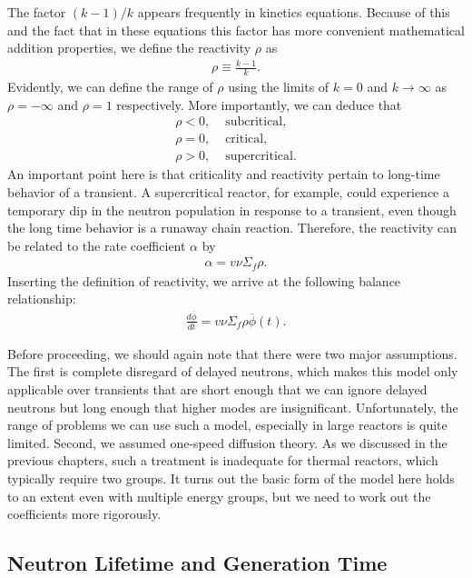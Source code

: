 The factor $(k-1)/k$ appears frequently in kinetics equations. Because of this and the fact that in these equations this factor has more convenient mathematical addition properties, we define the reactivity $\rho$ as
\begin{align}
  \rho \equiv \frac{ k - 1 }{ k } .
\end{align}
Evidently, we can define the range of $\rho$ using the limits of $k = 0$ and $k \rightarrow \infty$ as $\rho = -\infty$ and $\rho = 1$ respectively. More importantly, we can deduce that
\begin{align}
  \rho < 0, &\text{ subcritical,} \nonumber \\
  \rho = 0, &\text{ critical,} \nonumber \\
  \rho > 0, &\text{ supercritical.} \nonumber
\end{align}
An important point here is that criticality and reactivity pertain to long-time behavior of a transient. A supercritical reactor, for example, could experience a temporary dip in the neutron population in response to a transient, even though the long time behavior is a runaway chain reaction. Therefore, the reactivity can be related to the rate coefficient $\alpha$ by
\begin{align}
  \alpha = v \nu \Sigma_f \rho .
\end{align}
Inserting the definition of reactivity, we arrive at the following balance relationship:
\begin{align}
  \frac{d \overline{\phi}}{dt} = v \nu \Sigma_f \rho \overline{\phi}(t).
\end{align}

Before proceeding, we should again note that there were two major assumptions. The first is complete disregard of delayed neutrons, which makes this model only applicable over transients that are short enough that we can ignore delayed neutrons but long enough that higher modes are insignificant. Unfortunately, the range of problems we can use such a model, especially in large reactors is quite limited. Second, we assumed one-speed diffusion theory. As we discussed in the previous chapters, such a treatment is inadequate for thermal reactors, which typically require two groups. It turns out the basic form of the model here holds to an extent even with multiple energy groups, but we need to work out the coefficients more rigorously.

\subsection{Neutron Lifetime and Generation Time}

